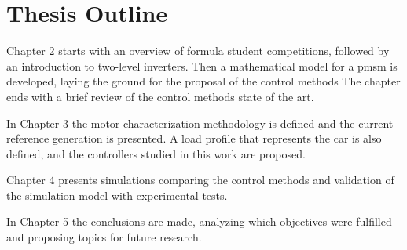 \section{Thesis Outline}\label{section:outline}

Chapter 2 starts with an overview of formula student competitions, followed by an introduction to two-level inverters. Then a mathematical model for a \gls{pmsm} is developed, laying the ground for the proposal of the control methods The chapter ends with a brief review of the control methods state of the art.

In Chapter 3 the motor characterization methodology is defined and the current reference generation is presented. A load profile that represents the car is also defined, and the controllers studied in this work are proposed.

Chapter 4 presents simulations comparing the control methods and validation of the simulation model with experimental tests.

In Chapter 5 the conclusions are made, analyzing which objectives were fulfilled and proposing topics for future research.